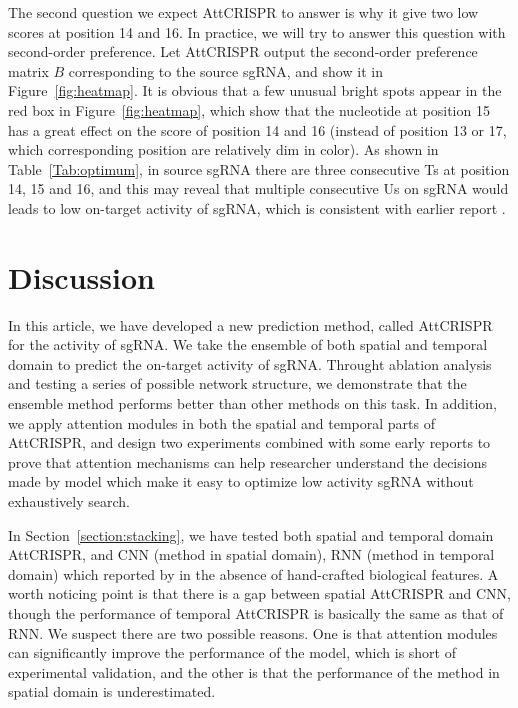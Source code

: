 \documentclass{bioinfo}
\begin{document}
The second question we expect AttCRISPR to answer is why it give two low scores at position 14 and 16. 
In practice, we will try to answer this question with second-order preference. 
Let AttCRISPR output the second-order preference matrix $B$ corresponding to the source sgRNA, and show it in Figure~\ref{fig:heatmap}. 
It is obvious that a few unusual bright spots appear in the red box in Figure~\ref{fig:heatmap}, 
which show that the nucleotide at position 15 has a great effect on the score of position 14 and 16 (instead of position 13 or 17, which corresponding position are relatively dim in color). 
As shown in Table~\ref{Tab:optimum}, in source sgRNA there are three consecutive Ts at position 14, 15 and 16, and this may reveal that multiple consecutive Us on sgRNA would leads to low on-target activity of sgRNA, which is consistent with earlier report \citep{wu2014genome-wide}. 

\section{Discussion}

In this article, we have developed a new prediction method, called AttCRISPR for the activity of sgRNA. 
We take the ensemble of both spatial and temporal domain to predict the on-target activity of sgRNA. 
Throught ablation analysis and testing a series of possible network structure, we demonstrate that the ensemble method performs better than other methods on this task. 
In addition, we apply attention modules in both the spatial and temporal parts of AttCRISPR, 
and design two experiments combined with some early reports to prove that attention mechanisms can help researcher understand the decisions made by model which make it easy to optimize low activity sgRNA without exhaustively search. 

In Section~\ref{section:stacking}, we have tested both spatial and temporal domain AttCRISPR, and CNN (method in spatial domain), RNN (method in temporal domain) which reported by \citeauthor{wang2019optimized} in the absence of hand-crafted biological features. 
A worth noticing point is that there is a gap between spatial AttCRISPR and CNN, though the performance of temporal AttCRISPR is basically the same as that of RNN. 
We suspect there are two possible reasons. 
One is that attention modules can significantly improve the performance of the model, which is short of experimental validation, 
and the other is that the performance of the method in spatial domain is underestimated. 
\end{document}
